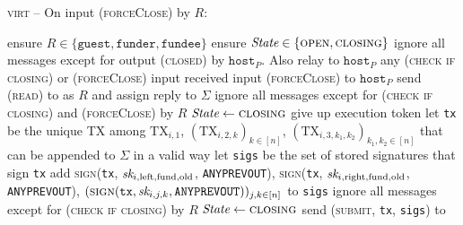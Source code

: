 \begin{center}
  \begin{processbox}{\textsc{virt} -- On input (\textsc{forceClose}) by $R$:}
    \begin{algorithmic}[1]
      \State {}
      \State ensure $R  \in \{\texttt{guest}, \texttt{funder},
      \texttt{fundee}\}$
      \label{code:virtual-layer:close:output-guest-punished}
      \State ensure $\textit{State} \in \{\textsc{open}, \textsc{closing}\}$
       
      \label{code:virtual-layer:close:if-nested-host}
        \State ignore all messages except for output (\textsc{closed}) by
        $\texttt{host}_P$. Also relay to $\texttt{host}_P$ any (\textsc{check if
        closing}) or (\textsc{forceClose}) input received
        \State input (\textsc{forceClose}) to $\texttt{host}_P$
      \EndIf
      \State {}
      \State send (\textsc{read}) to \ledger as $R$ and assign reply to
      $\Sigma$
       
        \State ignore all messages except for (\textsc{check if closing}) and
        (\textsc{forceClose}) by $R$
        \State $\textit{State} \gets \textsc{closing}$
        \State give up execution token 
      \EndIf
      \State let \texttt{tx} be the unique TX among $\mathrm{TX}_{i, 1}$,
      $(\mathrm{TX}_{i, 2, k})_{k \in [n]}$, $(\mathrm{TX}_{i, 3, k_1,
      k_2})_{k_1, k_2 \in [n]}$ that can be appended to $\Sigma$ in a valid way
      \label{code:virtual-layer:close:tx}
      \State let \texttt{sigs} be the set of stored signatures that sign
      \texttt{tx}
      \State add \textsc{sign}(\texttt{tx}, $\textit{sk}_{i, \mathrm{left},
      \mathrm{fund}, \mathrm{old}}$, \texttt{ANYPREVOUT}),
      \textsc{sign}(\texttt{tx}, $\textit{sk}_{i, \mathrm{right}, \mathrm{fund},
      \mathrm{old}}$, \texttt{ANYPREVOUT}), $(\textsc{sign}(\texttt{tx}, \textit{sk}_{i,
      j, k}, \texttt{ANYPREVOUT}))_{j, k \in [n]}$ to \texttt{sigs}
      \State ignore all messages except for (\textsc{check if closing}) by $R$
      \State $\textit{State} \gets \textsc{closing}$
      \State send (\textsc{submit}, \texttt{tx}, \texttt{sigs}) to \ledger
    \end{algorithmic}
  \end{processbox}
  \label{code:virtual-layer:close}
\end{center} \ \\


